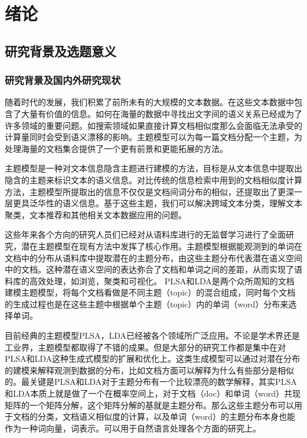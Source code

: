 
\chapter{绪论}

\section{研究背景及选题意义}
\subsection{研究背景及国内外研究现状}
随着时代的发展，我们积累了前所未有的大规模的文本数据。在这些文本数据中包含了大量有价值的信息。如何在海量的数据中寻找出文字间的语义关系已经成为了许多领域的重要问题。如搜索领域如果直接计算文档相似度那么会面临无法承受的计算量同时会受到语义漂移的影响。主题模型可以为每一篇文档分配一个主题，为处理海量的文档集合提供了一个更有前景和更能拓展的方法。

主题模型是一种对文本信息隐含主题进行建模的方法，目标是从文本信息中提取出隐含的主题来标识文本的语义信息。对比传统的信息检索中用到的文档相似度计算方法，主题模型所提取出的信息不仅仅是文档间词分布的相似，还提取出了更深一层更具泛华性的语义信息。基于这些主题，我们可以解决跨域文本分类\cite{Barathi}，理解文本聚类\cite{TopicClust}，文本推荐\cite{krestel2009latent}和其他相关文本数据应用的问题。

这些年来各个方向的研究人员们已经对从语料库进行的无监督学习进行了全面研究，潜在主题模型在现有方法中发挥了核心作用。主题模型根据能观测到的单词在文档中的分布从语料库中提取潜在的主题分布，由这些主题分布代表潜在语义空间中的文档。这种潜在语义空间的表达弥合了文档和单词之间的差距，从而实现了语料库的高效处理，如浏览，聚类和可视化。 PLSA\cite{PLSI}和LDA\cite{LDA}是两个众所周知的文档建模主题模型，将每个文档看做是不同主题（topic）的混合组成，同时每个文档的生成过程也是在这些主题中根据单个主题（topic）内的单词（word）分布来选择单词。

目前经典的主题模型PLSA，LDA已经被各个领域所广泛应用。不论是学术界还是工业界，主题模型都取得了不错的成果。但是大部分的研究工作都是集中在对PLSA和LDA这种生成式模型的扩展和优化上。这类生成模型可以通过对潜在分布的建模来解释观测到数据的分布，比如文档方面可以解释为什么有些部分是相似的。最关键是PLSA和LDA对于主题分布有一个比较漂亮的数学解释，其实PLSA和LDA本质上就是做了一个在概率空间上，对于文档（doc）和单词（word）共现矩阵的一个矩阵分解，这个矩阵分解的基就是主题分布。那么这些主题分布可以用于文档的分类，文档语义相似度的计算，以及单词（word）的主题分布本身也能作为一种词向量，词表示。可以用于自然语言处理各个方面的研究上。

